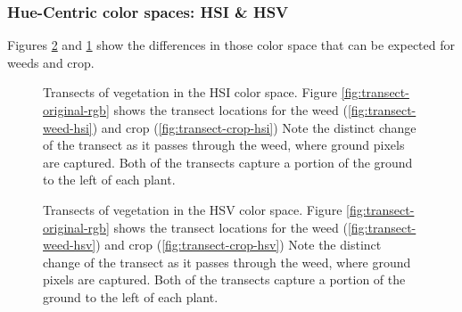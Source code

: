 \documentclass[letterpaper, notitlepage]{report}
\begin{document}
\subsubsection{Hue-Centric color spaces: HSI \& HSV}
Figures \ref{fig:transects-hsv} and \ref{fig:transects-hsi} show the differences in those color space that can be expected for weeds and crop.

\begin{figure}[!htb]
	\centering
	\hfill
	\hfill
	\caption[HSI Transects]{Transects of vegetation in the HSI color space. Figure \ref{fig:transect-original-rgb} shows the transect locations for the weed (\ref{fig:transect-weed-hsi}) and crop (\ref{fig:transect-crop-hsi}) Note the distinct change of the transect as it passes through the weed, where ground pixels are captured. Both of the transects capture a portion of the ground to the left of each plant.}
	\label{fig:transects-hsi}
\end{figure}

\begin{figure}[!htb]
	\centering
	\hfill
	\hfill
	\caption[HSV Transects]{Transects of vegetation in the HSV color space. Figure \ref{fig:transect-original-rgb} shows the transect locations for the weed (\ref{fig:transect-weed-hsv}) and crop (\ref{fig:transect-crop-hsv}) Note the distinct change of the transect as it passes through the weed, where ground pixels are captured. Both of the transects capture a portion of the ground to the left of each plant.}
	\label{fig:transects-hsv}
\end{figure}
\end{document}
